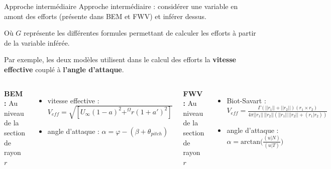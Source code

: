 \documentclass[
11pt,notheorems,hyperref={pdfauthor=whatever}
]{beamer}
\begin{document}
\begin{frame}{Approche intermédiaire}
    Approche intermédiaire : considérer une variable en amont des efforts (présente dans BEM et FWV) et inférer dessus. 

        \begin{center}

    \vspace{0.3cm}
    Où $G$ représente les différentes formules permettant de calculer les efforts à partir de la variable inférée.

    \vspace{0.2cm}

    Par exemple, les deux modèles utilisent dans le calcul des efforts la \textbf{vitesse effective} couplé à \textbf{l'angle d'attaque}.
    \begin{columns}[c]
        \textbf{BEM :}
        Au niveau de la section de rayon $r$
        \begin{itemize}\small
            \item vitesse effective : $V_{eff} = \sqrt{\left[ U_{\infty}(1-a)^2 + ^\Omega r(1+a')^2\right]}$
            \item angle d'attaque : $\alpha = \varphi -\left(\beta + \theta_{pitch}\right)$
        \end{itemize}

        \centering

        \textbf{FWV :}
        Au niveau de la section de rayon $r$ 
        \begin{itemize}\small
            \item Biot-Savart :  $V_{eff} = \frac{\Gamma(||r_1|| + ||r_2||)(r_1 \times r_2)}{4\pi ||r_1|| \, ||r_2||(||r_1||\,||r_2|| + (r_1 | r_2))}$
            \item angle d'attaque :  $\alpha = \text{arctan}\bigl(\frac{(u|N)}{(u|T)}\bigr)$
        \end{itemize}
    \end{columns}    
    \end{center}
\end{frame}
\end{document}
